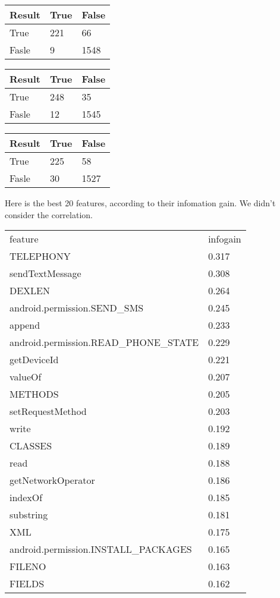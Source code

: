\begin{tabular}{|l|l l|}
\hline
Result & True & False \\
\hline
True & 221 & 66 \\
Fasle & 9 & 1548 \\
\hline
\end{tabular}
\begin{tabular}{|l|l l|}
\hline
Result & True & False \\
\hline
True & 248 & 35 \\
Fasle & 12 & 1545 \\
\hline
\end{tabular}
\begin{tabular}{|l|l l|}
\hline
Result & True & False \\
\hline
True & 225 & 58 \\
Fasle & 30 & 1527 \\
\hline
\end{tabular}

Here is the best 20 features, according to their infomation gain. We didn't consider the correlation.

\begin{tabular}{l l}
 feature & infogain \\
 TELEPHONY & 0.317 \\
 sendTextMessage & 0.308 \\
 DEXLEN & 0.264 \\
 android.permission.SEND\_SMS & 0.245 \\
 append & 0.233 \\
 android.permission.READ\_PHONE\_STATE & 0.229 \\
 getDeviceId & 0.221 \\
 valueOf & 0.207 \\
 METHODS & 0.205 \\
 setRequestMethod & 0.203 \\
 write & 0.192 \\
 CLASSES & 0.189 \\
 read & 0.188 \\
 getNetworkOperator & 0.186 \\
 indexOf & 0.185 \\
 substring & 0.181 \\
 XML & 0.175 \\
 android.permission.INSTALL\_PACKAGES & 0.165 \\
 FILENO & 0.163 \\
 FIELDS & 0.162 \\
\end{tabular}

